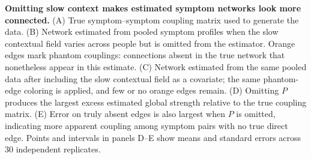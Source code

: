 
\caption{\textbf{Omitting slow context makes estimated symptom networks look more connected.}
(A) True symptom--symptom coupling matrix used to generate the data.
(B) Network estimated from pooled symptom profiles when the slow contextual field varies across people but is omitted from the estimator. Orange edges mark phantom couplings: connections absent in the true network that nonetheless appear in this estimate.
(C) Network estimated from the same pooled data after including the slow contextual field as a covariate; the same phantom-edge coloring is applied, and few or no orange edges remain.
(D) Omitting \(P\) produces the largest excess estimated global strength relative to the true coupling matrix.
(E) Error on truly absent edges is also largest when \(P\) is omitted, indicating more apparent coupling among symptom pairs with no true direct edge. Points and intervals in panels D--E show means and standard errors across 30 independent replicates.}
